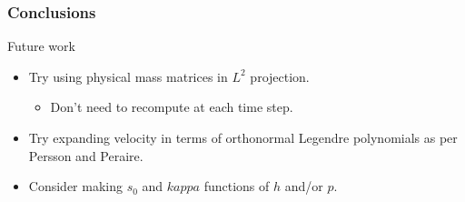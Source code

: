 \documentclass[8pt,xcolor=svgnames]{beamer}
\begin{document}
\begin{frame}\frametitle{Conclusions}
\begin{block}{Future work}
\begin{itemize}
\item Try using physical mass matrices in $L^2$ projection.
\begin{itemize}
\item Don't need to recompute at each time step.
\end{itemize}
\item Try expanding velocity in terms of orthonormal Legendre polynomials as per Persson and Peraire.
\item Consider making $s_0$ and $kappa$ functions of $h$ and/or $p$.
\end{itemize}
\end{block}
\end{frame}


% 
% 
\end{document}
